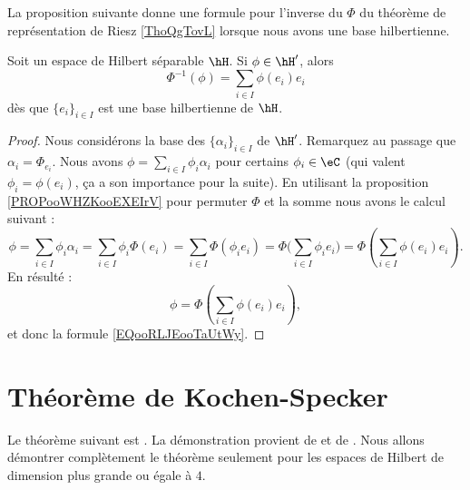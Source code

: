 La proposition suivante donne une formule pour l'inverse du \( \Phi\) du théorème de représentation de Riesz \ref{ThoQgTovL} lorsque nous avons une base hilbertienne.
\begin{proposition}
	Soit un espace de Hilbert séparable \( \hH\). Si \( \phi\in \hH'\), alors
	\begin{equation}    \label{EQooRLJEooTaUtWy}
		\Phi^{-1}(\phi)=\sum_{i\in I}\phi(e_i)e_i
	\end{equation}
	dès que \( \{ e_i \}_{i\in I}\) est une base hilbertienne de \( \hH\).
\end{proposition}

\begin{proof}
	Nous considérons la base des \( \{ \alpha_i \}_{i\in I}\) de \( \hH'\). Remarquez au passage que \( \alpha_i=\Phi_{e_i}\).  Nous avons \( \phi=\sum_{i\in I}\phi_i\alpha_i\) pour certains \( \phi_i\in \eC\) (qui valent \( \phi_i=\phi(e_i)\), ça a son importance pour la suite). En utilisant la proposition \ref{PROPooWHZKooEXEIrV} pour permuter \( \Phi\) et la somme nous avons le calcul suivant :
	\begin{equation}
		\phi=\sum_{i\in I}\phi_i\alpha_i=\sum_{i\in I}\phi_i\Phi(e_i)=\sum_{i\in I}\Phi(\phi_ie_i)=\Phi\big( \sum_{i\in I}\phi_ie_i \big)=\Phi(\sum_{i\in I}\phi(e_i)e_i).
	\end{equation}
	En résulté :
	\begin{equation}
		\phi=\Phi(\sum_{i\in I}\phi(e_i)e_i),
	\end{equation}
	et donc la formule \eqref{EQooRLJEooTaUtWy}.
\end{proof}

\section{Théorème de Kochen-Specker}

Le théorème suivant est . La démonstration provient de \cite{BainKochen} et de . Nous allons démontrer complètement le théorème seulement pour les espaces de Hilbert de dimension plus grande ou égale à \( 4\).

